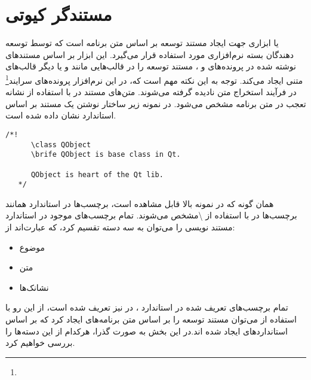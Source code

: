 %
% 
% 
% 
%
\section{مستندگر کیوتی}

 یا  ابزاری جهت ایجاد مستند توسعه بر اساس متن برنامه است که توسط توسعه دهندگان
بسته نرم‌افزاری  مورد استفاده قرار می‌گیرد. این ابزار بر اساس مستند‌های نوشته شده در 
پرونده‌های  و ،  مستند توسعه را در قالب‌هایی مانند  و یا دیگر قالب‌های
متنی ایجاد می‌کند. توجه به این نکته مهم است که، در این نرم‌افزار پرونده‌های سرایند\footnote{}
در فرآیند استخراج متن نادیده گرفته می‌شوند. متن‌های مستند در  با استفاده از نشانه تعجب 
در متن برنامه مشخص می‌شود. در نمونه زیر ساختار نوشتن یک مستند بر اساس استاندارد 
نشان داده شده است.
\begin{latin}
 \lstset{language=C++}  
\begin{lstlisting}[frame=single] 
  /*! 
      \class QObject
      \brife QObject is base class in Qt.
      
      QObject is heart of the Qt lib.
   */
\end{lstlisting}
\end{latin}

همان گونه که در نمونه بالا قابل مشاهده است، برچسب‌ها در استاندارد  همانند 
برچسب‌ها در   با استفاده از \textbackslash مشخص می‌شوند. تمام برچسب‌های
موجود در استاندارد مستند نویسی  را می‌توان به سه دسته تقسیم کرد، که عبارت‌اند از:
\begin{itemize}
 \item موضوع
 \item متن
 \item نشانک‌ها
\end{itemize}
تمام برچسب‌های تعریف شده در استاندارد  ، در  نیز تعریف شده است، از این رو 
با استفاده از  می‌توان مستند توسعه را بر اساس متن برنامه‌های ایجاد کرد که بر اساس
استانداردهای ‌ایجاد شده اند.در این بخش به صورت گذرا، هرکدام از این دسته‌ها را بررسی 
خوا‌هیم کرد.
